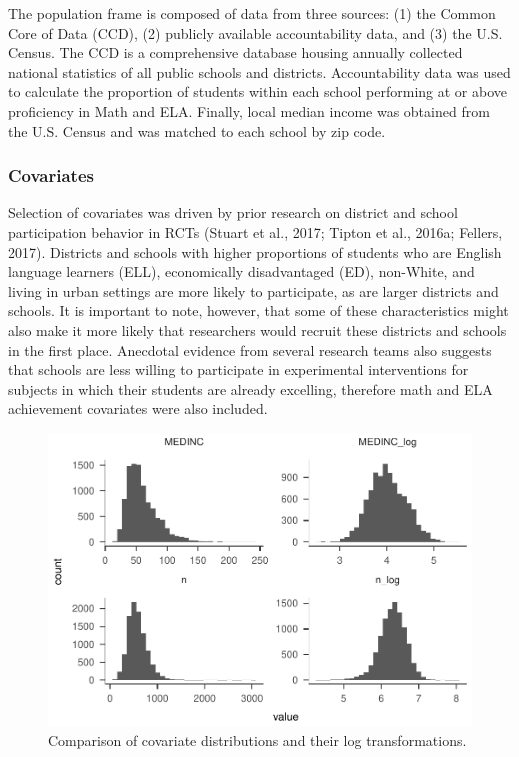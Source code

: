 \documentclass[,man]{apa6}
\theoremstyle{definition}
\theoremstyle{definition}
\theoremstyle{definition}
\theoremstyle{remark}
\begin{document}
The population frame is composed of data from three sources: (1) the
Common Core of Data (CCD), (2) publicly available accountability data,
and (3) the U.S. Census. The CCD is a comprehensive database housing
annually collected national statistics of all public schools and
districts. Accountability data was used to calculate the proportion of
students within each school performing at or above proficiency in Math
and ELA. Finally, local median income was obtained from the U.S. Census
and was matched to each school by zip code.

\hypertarget{covariates}{%
\subsubsection{Covariates}\label{covariates}}

Selection of covariates was driven by prior research on district and
school participation behavior in RCTs (Stuart et al., 2017; Tipton et
al., 2016a; Fellers, 2017). Districts and schools with higher
proportions of students who are English language learners (ELL),
economically disadvantaged (ED), non-White, and living in urban settings
are more likely to participate, as are larger districts and schools. It
is important to note, however, that some of these characteristics might
also make it more likely that researchers would recruit these districts
and schools in the first place. Anecdotal evidence from several research
teams also suggests that schools are less willing to participate in
experimental interventions for subjects in which their students are
already excelling, therefore math and ELA achievement covariates were
also included.

\begin{figure}
\centering
\includegraphics{Method_files/figure-latex/dists-1.pdf}
\caption{\label{fig:dists}Comparison of covariate distributions and their
log transformations.}
\end{figure}
\end{document}
